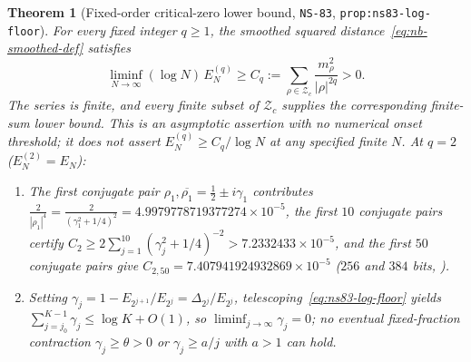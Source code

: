 \documentclass[11pt]{article}
\newtheorem{theorem}{Theorem}[section]
\theoremstyle{remark}
\begin{document}
\begin{theorem}[Fixed-order critical-zero lower bound, \texttt{NS-83}, \texttt{prop:ns83-log-floor}]
\label{thm:nb-log-floor}
For every fixed integer $q \ge 1$, the smoothed squared distance~\eqref{eq:nb-smoothed-def} satisfies
\begin{equation}\label{eq:ns83-log-floor}
  \liminf_{N \to \infty} (\log N)\,E_N^{(q)} \ge C_q := \sum_{\rho \in \mathcal{Z}_c} \frac{m_\rho^2}{|\rho|^{2q}} > 0.
\end{equation}
The series is finite, and every finite subset of $\mathcal{Z}_c$ supplies the corresponding finite-sum lower bound. This is an asymptotic assertion with no numerical onset threshold; it does not assert $E_N^{(q)} \ge C_q/\log N$ at any specified finite $N$. At $q = 2$ ($E_N^{(2)} = E_N$):
\begin{enumerate}[label=(\alph*)]
  \item The first conjugate pair $\rho_1, \overline{\rho_1} = \tfrac{1}{2} \pm i\gamma_1$ contributes $\frac{2}{|\rho_1|^4} = \frac{2}{(\gamma_1^2 + 1/4)^2} = 4.9979778719377274 \times 10^{-5}$, the first $10$ conjugate pairs certify $C_2 \ge 2\sum_{j=1}^{10}(\gamma_j^2 + 1/4)^{-2} > 7.2332433 \times 10^{-5}$, and the first $50$ conjugate pairs give $C_{2,50} = 7.407941924932869 \times 10^{-5}$ ($256$ and $384$ bits, ).
  \item Setting $\gamma_j = 1 - E_{2^{j+1}}/E_{2^j} = \Delta_{2^j}/E_{2^j}$, telescoping~\eqref{eq:ns83-log-floor} yields $\sum_{j=j_0}^{K-1} \gamma_j \le \log K + O(1)$, so $\liminf_{j\to\infty} \gamma_j = 0$; no eventual fixed-fraction contraction $\gamma_j \ge \theta > 0$ or $\gamma_j \ge a/j$ with $a > 1$ can hold.
\end{enumerate}
\end{theorem}
\end{document}
